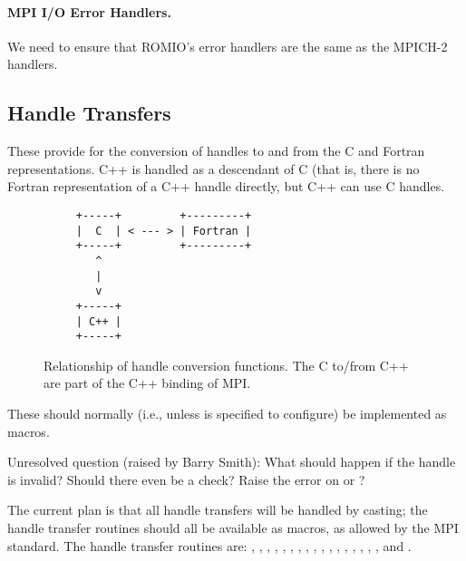 \documentclass{article}
\begin{document}
\paragraph{MPI I/O Error Handlers.}
We need to ensure that ROMIO's error handlers are the same as the MPICH-2
handlers.

\subsection{Handle Transfers}
These provide for the conversion of handles to and from the C and
Fortran representations.  C++ is handled as a descendant of C (that
is, there is no Fortran representation of a C++ handle directly, but
C++ can use C handles.  
\begin{figure}
\begin{verbatim}
     +-----+         +---------+
     |  C  | < --- > | Fortran |
     +-----+         +---------+
        ^
        |
        v
     +-----+ 
     | C++ | 
     +-----+ 
\end{verbatim}
\caption{Relationship of handle conversion functions.  The C to/from
C++ are part of the C++ binding of MPI.}\label{fig:handle-transfers}
\end{figure}
These should normally (i.e., unless
 is
specified to configure) be implemented as macros.  

Unresolved question (raised by Barry Smith):  What should happen if
the handle is invalid?  Should there even be a check?  Raise the error
on  or ?

The current plan is that all handle transfers will be handled by casting;
the handle transfer routines should all be available as macros, as allowed by
the MPI standard.  The handle transfer routines are:
,
,
,
,
,
,
,
,
,
,
,
,
,
,
,
,
, and
.
\end{document}
